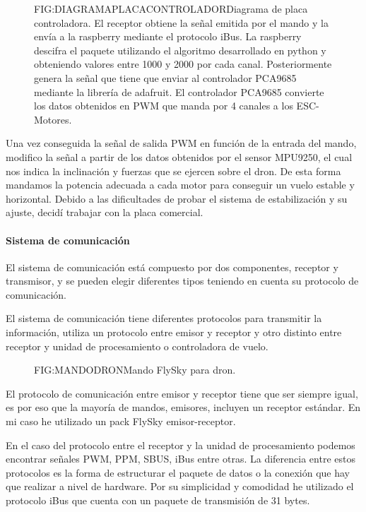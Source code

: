 \begin{figure}[Diagrama placa controladora desarrollada]{FIG:DIAGRAMAPLACACONTROLADOR}{Diagrama de placa controladora. El receptor obtiene la señal emitida por el mando y la envía a la raspberry mediante el protocolo iBus. La raspberry descifra el paquete utilizando el algoritmo desarrollado  en python y obteniendo valores entre 1000 y 2000 por cada canal. Posteriormente genera la señal que tiene que enviar al controlador PCA9685 mediante la librería de adafruit. El controlador PCA9685 convierte los datos obtenidos en PWM que manda por 4 canales a los ESC-Motores.}
\end{figure}

Una vez conseguida la señal de salida PWM en función de la entrada del mando, modifico la señal a partir de los datos obtenidos por el sensor MPU9250, el cual nos indica la inclinación y fuerzas que se ejercen sobre el dron.
De esta forma mandamos la potencia adecuada a cada motor para conseguir un vuelo estable y horizontal. Debido a las dificultades de probar el sistema de estabilización y su ajuste, decidí trabajar con la placa comercial.

\paragraph{Sistema de comunicación}

	El sistema de comunicación está compuesto por dos componentes, receptor y transmisor, y se pueden elegir diferentes tipos teniendo en cuenta su protocolo de comunicación. 
	
	El sistema de comunicación tiene diferentes protocolos para transmitir la información, utiliza un protocolo entre emisor y receptor y otro distinto entre receptor y unidad de procesamiento o controladora de vuelo.\cite{Eric2017}
	
	\begin{figure}[Mando FlySky dron]{FIG:MANDODRON}{Mando FlySky para dron.}
\end{figure}	
	
	El protocolo de comunicación entre emisor y receptor tiene que ser siempre igual, es por eso que la mayoría de mandos, emisores, incluyen un receptor estándar. En mi caso he utilizado un pack FlySky emisor-receptor.
	
	En el caso del protocolo entre el receptor y la unidad de procesamiento podemos encontrar señales PWM, PPM, SBUS, iBus entre otras. La diferencia entre estos protocolos es la forma de estructurar el paquete de datos o la conexión que hay que realizar a nivel de hardware. Por su simplicidad y comodidad he utilizado el protocolo iBus que cuenta con un paquete de transmisión de 31 bytes.
	